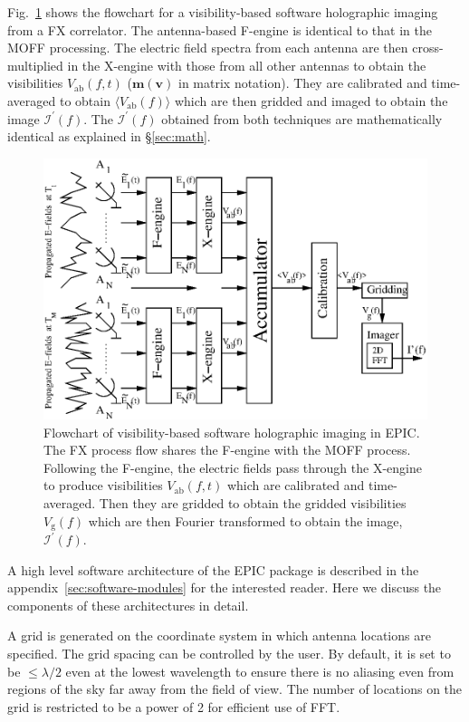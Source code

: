 \documentclass[a4paper,fleqn,usenatbib]{mnras}
\begin{document}
Fig.~\ref{fig:FX-flowchart} shows the flowchart for a visibility-based software holographic imaging from a FX correlator. The antenna-based F-engine is identical to that in the MOFF processing. The electric field spectra from each antenna are then cross-multiplied in the X-engine with those from all other antennas to obtain the visibilities $V_\textrm{ab}(f,t)$ ($\mathbf{m}(\mathbf{v})$ in matrix notation). They are calibrated and time-averaged to obtain $\langle V_\textrm{ab}(f)\rangle$ which are then gridded and imaged to obtain the image $\mathcal{I}^\prime(f)$. The $\mathcal{I}^\prime(f)$ obtained from both techniques are mathematically identical as explained in \S\ref{sec:math}.

\begin{figure}
  \includegraphics[width=\columnwidth]{figure2}
  \caption{Flowchart of visibility-based software holographic imaging in EPIC. The FX process flow shares the F-engine with the MOFF process. Following the F-engine, the electric fields pass through the X-engine to produce visibilities $V_\textrm{ab}(f,t)$ which are calibrated and time-averaged. Then they are gridded to obtain the gridded visibilities $V_\textrm{g}(f)$ which are then Fourier transformed to obtain the image, $\mathcal{I}^\prime(f)$.}
  \label{fig:FX-flowchart}
\end{figure}

A high level software architecture of the EPIC package is described in the 
appendix~\ref{sec:software-modules} for the interested reader. Here we discuss the components of these architectures in detail. 

\par\medskip
{}
\par\medskip
\noindent A grid is generated on the coordinate system in which antenna 
locations are specified. The grid spacing can be controlled 
by the user. By default, it is set to be $\le\lambda/2$ even at the 
lowest wavelength to ensure there is no aliasing even from regions of the sky 
far away from the field of view. The number of locations on the grid is 
restricted to be a power of 2 for efficient use of FFT. 
\end{document}
